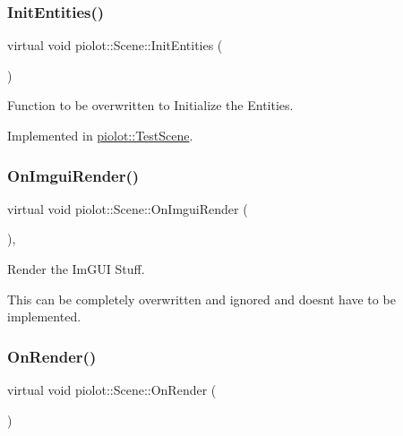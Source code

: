 \subsubsection{\texorpdfstring{Init\+Entities()}{InitEntities()}}
{\footnotesize\ttfamily virtual void piolot\+::\+Scene\+::\+Init\+Entities (\begin{DoxyParamCaption}{ }\end{DoxyParamCaption})\hspace{0.3cm}{\ttfamily [pure virtual]}}



Function to be overwritten to Initialize the Entities. 



Implemented in \mbox{\hyperlink{classpiolot_1_1_test_scene_a76c03545ecd764cd4350eec338c9a94e}{piolot\+::\+Test\+Scene}}.

\mbox{\label{group___virtual_gaedea470f1c3485d76ef0681e4a503584}} 
\subsubsection{\texorpdfstring{On\+Imgui\+Render()}{OnImguiRender()}}
{\footnotesize\ttfamily virtual void piolot\+::\+Scene\+::\+On\+Imgui\+Render (\begin{DoxyParamCaption}{ }\end{DoxyParamCaption})\hspace{0.3cm}{\ttfamily [inline]}, {\ttfamily [virtual]}}



Render the Im\+G\+UI Stuff. 

This can be completely overwritten and ignored and doesn\textquotesingle{}t have to be implemented. \mbox{\label{group___virtual_gaaa3f6f2cb0dce355d890c8b43a2f11f2}} 
\subsubsection{\texorpdfstring{On\+Render()}{OnRender()}}
{\footnotesize\ttfamily virtual void piolot\+::\+Scene\+::\+On\+Render (\begin{DoxyParamCaption}{ }\end{DoxyParamCaption})\hspace{0.3cm}{\ttfamily [pure virtual]}}




